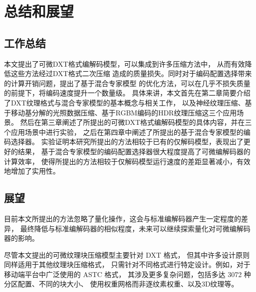 
\chapter{总结和展望}

\section{工作总结}

本文提出了可微DXT格式编解码模型，可以集成到许多压缩方法中，
从而有效降低这些方法经过DXT格式二次压缩
造成的质量损失。同时对于编码配置选择带来的计算开销问题，提出了基于混合专家模型
的优化方法，可以在几乎不损失质量的前提下，将编码速度提升一个数量级。
具体来讲，本文首先在第二章简要介绍了DXT纹理格式与混合专家模型的基本概念与相关工作，
以及神经纹理压缩、基于移动基分解的光照数据压缩、基于RGBM编码的HDR纹理压缩这三个应用场景。
然后在第三章阐述了所提出的可微DXT格式编解码模型的具体内容，并在三个应用场景中进行实验，
之后在第四章中阐述了所提出的基于混合专家模型的编码选择器。
实验证明本研究所提出的方法相较于已有的仅解码模型，表现出了更好的结果，
基于混合专家模型的编码配置选择器很大程度提高了可微编解码器的计算效率，
使得所提出的方法相较于仅解码模型运行速度的差距显著减小，有效地增加了实用性。

\section{展望}

目前本文所提出的方法忽略了量化操作，这会与标准编解码器产生一定程度的差异，
最终降低与标准编解码器的相似程度，未来可以继续探索量化对可微编解码器的影响。

尽管本文提出的可微纹理块压缩模型主要针对 DXT 格式，
但其中许多设计原则同样适用于其他纹理块压缩格式，
只需针对不同格式进行特定设计。例如，对于移动端平台中广泛使用的 ASTC 格式，
其涉及更多复杂问题，包括多达 3072 种分区配置、不同的块大小、
使用权重网格而非逐纹素权重、以及3D纹理等。


